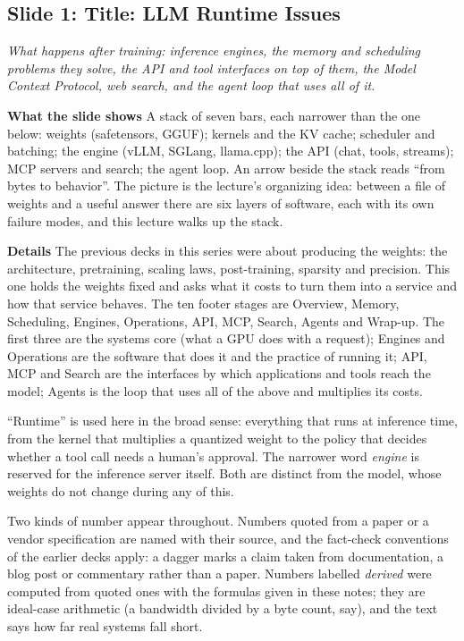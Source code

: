 \documentclass[11pt,letterpaper]{article}
\newcommand{\slide}[3]{%
  \subsection[Slide #1: #2]{Slide #1: #2}%
  {\color{muted}\itshape #3\par}\medskip}
\newcommand{\para}[1]{\medskip\noindent\textbf{#1}\quad}
\begin{document}
\slide{1}{Title: LLM Runtime Issues}{What happens after training: inference engines, the memory and scheduling problems they solve, the API and tool interfaces on top of them, the Model Context Protocol, web search, and the agent loop that uses all of it.}

\para{What the slide shows} A stack of seven bars, each narrower than the one below: weights (safetensors, GGUF); kernels and the KV cache; scheduler and batching; the engine (vLLM, SGLang, llama.cpp); the API (chat, tools, streams); MCP servers and search; the agent loop. An arrow beside the stack reads ``from bytes to behavior''. The picture is the lecture's organizing idea: between a file of weights and a useful answer there are six layers of software, each with its own failure modes, and this lecture walks up the stack.

\para{Details} The previous decks in this series were about producing the weights: the architecture, pretraining, scaling laws, post-training, sparsity and precision. This one holds the weights fixed and asks what it costs to turn them into a service and how that service behaves. The ten footer stages are Overview, Memory, Scheduling, Engines, Operations, API, MCP, Search, Agents and Wrap-up. The first three are the systems core (what a GPU does with a request); Engines and Operations are the software that does it and the practice of running it; API, MCP and Search are the interfaces by which applications and tools reach the model; Agents is the loop that uses all of the above and multiplies its costs.

``Runtime'' is used here in the broad sense: everything that runs at inference time, from the kernel that multiplies a quantized weight to the policy that decides whether a tool call needs a human's approval. The narrower word \emph{engine} is reserved for the inference server itself. Both are distinct from the model, whose weights do not change during any of this.

Two kinds of number appear throughout. Numbers quoted from a paper or a vendor specification are named with their source, and the fact-check conventions of the earlier decks apply: a dagger marks a claim taken from documentation, a blog post or commentary rather than a paper. Numbers labelled \emph{derived} were computed from quoted ones with the formulas given in these notes; they are ideal-case arithmetic (a bandwidth divided by a byte count, say), and the text says how far real systems fall short.
\end{document}
